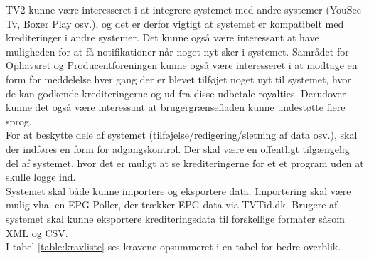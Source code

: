 \noindent
TV2 kunne være interesseret i at integrere systemet med andre systemer (YouSee Tv, Boxer Play osv.), og det er derfor vigtigt at systemet er kompatibelt med krediteringer i andre systemer. Det kunne også være interessant at have muligheden for at få notifikationer når noget nyt sker i systemet. Samrådet for Ophavsret og Producentforeningen kunne også være interesseret i at modtage en form for meddelelse hver gang der er blevet tilføjet noget nyt til systemet, hvor de kan godkende krediteringerne og ud fra disse udbetale royalties. Derudover kunne det også være interessant at brugergrænsefladen kunne undestøtte flere sprog.\\

\noindent
For at beskytte dele af systemet (tilføjelse/redigering/sletning af data osv.), skal der indføres en form for adgangskontrol. Der skal være en offentligt tilgængelig del af systemet, hvor det er muligt at se krediteringerne for et et program uden at skulle logge ind.\\

\noindent
Systemet skal både kunne importere og eksportere data. Importering skal være mulig vha. en EPG Poller, der trækker EPG data via TVTid.dk. Brugere af systemet skal kunne eksportere krediteringsdata til forskellige formater såsom XML og CSV.\\

\noindent
I tabel \ref{table:kravliste} ses kravene opsummeret i en tabel for bedre overblik.

